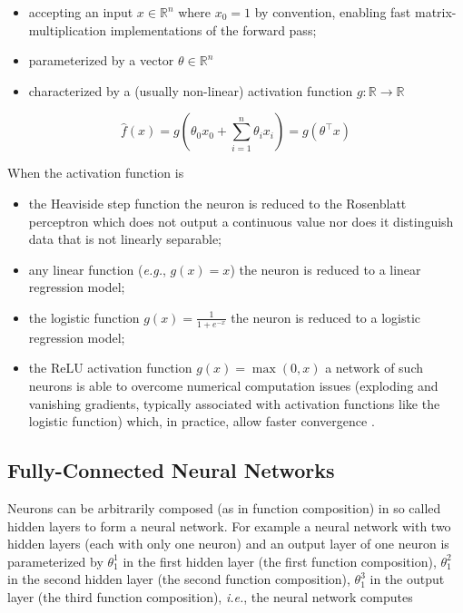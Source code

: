 \begin{itemize}
    \item accepting an input $x \in \mathbb{R}^{n}$ where $x_0 = 1$ by convention, enabling fast matrix-multiplication implementations of the forward pass;
    \item parameterized by a vector $\theta \in \mathbb{R}^{n}$
    \item characterized by a (usually non-linear) activation function $g \colon \mathbb{R} \to \mathbb{R}$
\end{itemize}

\begin{equation}
\hat{f}(x) = g(\theta_0 x_0 + \sum_{i=1}^{n}{\theta_i x_i}) = g(\theta^{\top} x)
\end{equation}

When the activation function is

\begin{itemize}
    \item the Heaviside step function the neuron is reduced to the Rosenblatt perceptron \cite{perceptron} which does not output a continuous value nor does it distinguish data that is not linearly separable;
    \item any linear function (\textit{e.g.}, $g(x) = x$) the neuron is reduced to a linear regression model;
    \item the logistic function $g(x) = \frac{1}{1 + e^{-x}}$ the neuron is reduced to a logistic regression model;
    \item the ReLU activation function $g(x) = \max(0, x)$ a network of such neurons is able to overcome numerical computation issues (exploding and vanishing gradients, typically associated with activation functions like the logistic function) which, in practice, allow faster convergence \cite{alexnet}.
\end{itemize}

\subsection{Fully-Connected Neural Networks}

Neurons can be arbitrarily composed (as in function composition) in so called hidden layers to form a neural network. For example a neural network with two hidden layers (each with only one neuron) and an output layer of one neuron is parameterized by $\theta^1_1$ in the first hidden layer (the first function composition), $\theta^2_1$ in the second hidden layer (the second function composition), $\theta^3_1$ in the output layer (the third function composition), \textit{i.e.}, the neural network computes

